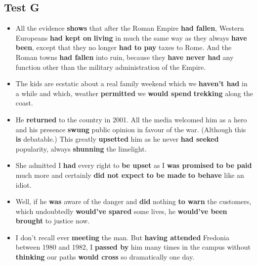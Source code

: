 \documentclass[a4paper]{article}
\begin{document}
\begin{enumerate}
    \section*{Test G}
    \begin{itemize}
        \item All the evidence {\bf shows} that after the Roman Empire {\bf had fallen}, Western Europeans {\bf had kept on} {\bf living} in much the same way as they always {\bf have been}, except that they no longer {\bf had to pay} taxes to Rome. And the Roman towns {\bf had fallen} into ruin, because they {\bf have never had} any function other than the military administration of the Empire.
        \item The kids are ecstatic about a real family weekend which we {\bf haven't had} in a while and which, weather {\bf permitted} we {\bf would spend} {\bf trekking} along the coast.
        \item He {\bf returned} to the country in 2001. All the media welcomed him as a hero and his presence {\bf swung} public opinion in favour of the war. (Although this {\bf is} debatable.) This greatly {\bf upsetted} him as he never {\bf had seeked} popularity, always {\bf shunning} the limelight.
        \item She admitted I {\bf had} every right to {\bf be upset} as I {\bf was promised} {\bf to be paid} much more and certainly {\bf did not expect} {\bf to be made} {\bf to behave} like an idiot.
        \item Well, if he {\bf was} aware of the danger and {\bf did} nothing {\bf to warn} the customers, which undoubtedly {\bf would've spared} some lives, he {\bf would've been brought} to justice now.
        \item I don't recall ever {\bf meeting} the man. But {\bf having attended} Fredonia between 1980 and 1982, I {\bf passed by} him many times in the campus without {\bf thinking} our paths {\bf would cross} so dramatically one day.
    \end{itemize}
\end{enumerate}
\end{document}
